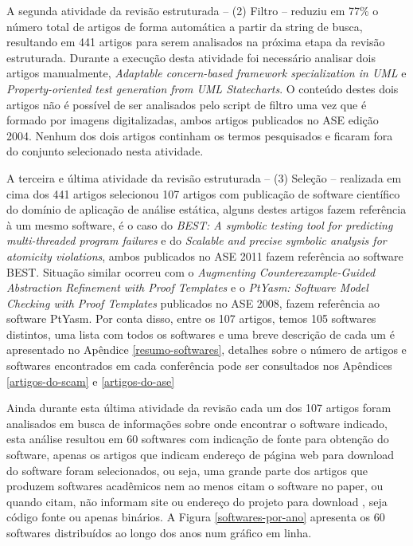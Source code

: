 A segunda atividade da revisão estruturada -- (2) Filtro -- reduziu em 77\%
o número total de artigos de forma automática a partir da string de busca, resultando em 441 artigos
para serem analisados na próxima etapa da revisão estruturada.  Durante a execução desta
atividade foi necessário analisar dois artigos manualmente, {\it Adaptable
concern-based framework specialization in UML} e {\it Property-oriented test
generation from UML Statecharts}. O conteúdo destes dois artigos não é possível
de ser analisados pelo script de filtro uma vez que é formado por imagens
digitalizadas, ambos artigos publicados no ASE edição 2004. Nenhum dos dois
artigos continham os termos pesquisados e ficaram fora do conjunto selecionado
nesta atividade.

A terceira e última atividade da revisão estruturada -- (3) Seleção --
realizada em cima dos 441 artigos selecionou 107 artigos com publicação de
software científico do domínio de aplicação de análise estática, alguns destes
artigos fazem referência à um mesmo software, é o caso do {\it BEST: A symbolic
testing tool for predicting multi-threaded program failures} e do {\it Scalable
and precise symbolic analysis for atomicity violations}, ambos publicados no
ASE 2011 fazem referência ao software BEST. Situação similar ocorreu com o {\it Augmenting
Counterexample-Guided Abstraction Refinement with Proof Templates} e o {\it
PtYasm: Software Model Checking with Proof Templates} publicados no ASE 2008,
fazem referência ao software PtYasm. Por conta disso, entre os 107 artigos, temos
105 softwares distintos, uma lista com todos os softwares e uma breve descrição
de cada um é apresentado no Apêndice \ref{resumo-softwares},
detalhes sobre o número de artigos e softwares encontrados em cada conferência
pode ser consultados nos Apêndices \ref{artigos-do-scam} e \ref{artigos-do-ase} 

Ainda durante esta última atividade da revisão cada um dos 107 artigos foram
analisados em busca de informações sobre onde encontrar o software indicado,
esta análise resultou em 60 softwares com indicação de fonte para obtenção do
software, apenas os artigos que indicam endereço de página web para download do
software foram selecionados, ou seja, uma grande parte dos artigos que produzem
softwares acadêmicos nem ao menos citam o software no paper, ou quando citam,
não informam site ou endereço do projeto para download
\cite{allen2017engineering}, seja código fonte ou apenas binários. A Figura
\ref{softwares-por-ano} apresenta os 60 softwares distribuídos ao longo dos
anos num gráfico em linha.

